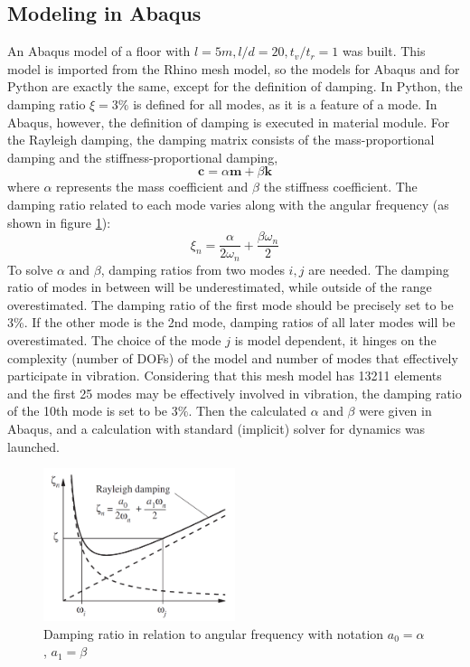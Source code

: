 \subsection{Modeling in Abaqus}
An Abaqus model of a floor with $l=5m, l/d=20, t_v/t_r=1$ was built. This model is imported from the Rhino mesh model, so the models for Abaqus and for Python are exactly the same, except for the definition of damping. In Python, the damping ratio $\xi=3\%$ is defined for all modes, as it is a feature of a mode. In Abaqus, however, the definition of damping is executed in material module. For the Rayleigh damping, the damping matrix consists of the mass-proportional damping and the stiffness-proportional damping,
\begin{equation}
    \mathbf{c}=\alpha\mathbf{m}+\beta\mathbf{k}
\end{equation}
\noindent
where $\alpha$ represents the mass coefficient and $\beta$ the stiffness coefficient. The damping ratio related to each mode varies along with the angular frequency (as shown in figure \ref{fig:damping}):
\begin{equation}
    \xi_n=\frac{\alpha}{2\omega_n}+\frac{\beta\omega_n}{2}
\end{equation}
\noindent
To solve $\alpha$ and $\beta$, damping ratios from two modes $i, j$ are needed. The damping ratio of modes in between will be underestimated, while outside of the range overestimated. The damping ratio of the first mode should be precisely set to be 3\%. If the other mode is the 2nd mode, damping ratios of all later modes will be overestimated. The choice of the mode $j$ is model dependent, it hinges on the complexity (number of DOFs) of the model and number of modes that effectively participate in vibration. Considering that this mesh model has 13211 elements and the first 25 modes may be effectively involved in vibration, the damping ratio of the 10th mode is set to be $3\%$. Then the calculated $\alpha$ and $\beta$ were given in Abaqus, and a calculation with standard (implicit) solver for dynamics was launched.
\begin{figure}[H]
\centering
\includegraphics[width=0.5\textwidth]{images/damping}
\caption{Damping ratio in relation to angular frequency \cite{chopra2007dynamics} with notation $a_0=\alpha$, $a_1=\beta$ }
\label{fig:damping}
\end{figure}
